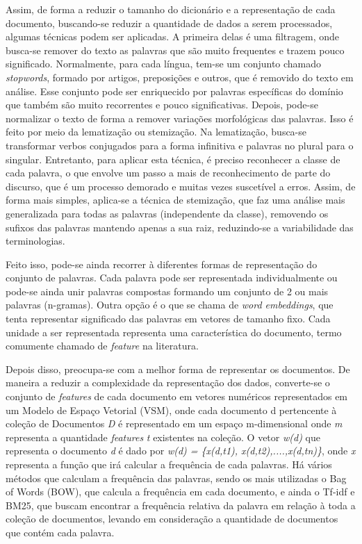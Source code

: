 Assim, de forma a reduzir o tamanho do dicionário e a representação de cada documento, buscando-se reduzir a quantidade de dados a serem processados, algumas técnicas podem ser aplicadas. A primeira delas é uma filtragem, onde busca-se remover do texto as palavras que são muito frequentes e trazem pouco significado. Normalmente, para cada língua, tem-se um conjunto chamado \textit{stopwords}, formado por artigos, preposições e outros, que é removido do texto em análise. Esse conjunto pode ser enriquecido por palavras específicas do domínio que também são muito recorrentes e pouco significativas. Depois, pode-se normalizar o texto de forma a remover variações morfológicas das palavras. Isso é feito por meio da lematização ou stemização. Na lematização, busca-se transformar verbos conjugados para a forma infinitiva e palavras no plural para o singular. Entretanto, para aplicar esta técnica, é preciso reconhecer a classe de cada palavra, o que envolve um passo a mais de reconhecimento de parte do discurso, que é um processo demorado e muitas vezes suscetível a erros. Assim, de forma mais simples, aplica-se a técnica de stemização, que faz uma análise mais generalizada para todas as palavras (independente da classe), removendo os sufixos das palavras mantendo apenas a sua raiz, reduzindo-se a variabilidade das terminologias. 

Feito isso, pode-se ainda recorrer à diferentes formas de representação do conjunto de palavras. Cada palavra pode ser representada individualmente ou pode-se ainda unir palavras compostas formando um conjunto de 2 ou mais palavras (n-gramas). Outra opção é o que se chama de \textit{word embeddings}, que tenta representar significado das palavras em vetores de tamanho fixo.  Cada unidade a ser representada representa uma característica do documento, termo comumente chamado de \textit{feature} na literatura.

Depois disso, preocupa-se com a melhor forma de representar os documentos.  De maneira a reduzir a complexidade da representação dos dados, converte-se o conjunto de \textit{features} de cada documento em vetores numéricos representados em um Modelo de Espaço Vetorial (VSM), onde cada documento d  pertencente à coleção de Documentos \textit{D} é representado em um espaço m-dimensional onde \textit{m} representa a quantidade \textit{features} \textit{t} existentes na coleção. O vetor \textit{w(d)} que representa o documento \textit{d} é dado por \textit{w(d) = \{x(d,t1), x(d,t2),....,x(d,tn)\}}, onde \textit{x} representa a função que irá calcular a frequência de cada palavras. Há vários métodos que calculam a frequência das palavras, sendo os mais utilizadas o Bag of Words (BOW), que calcula a frequência em cada documento, e ainda o  Tf-idf e BM25, que buscam encontrar a frequência relativa da palavra em relação à toda a coleção de documentos, levando em consideração a quantidade de documentos que contém cada palavra.

